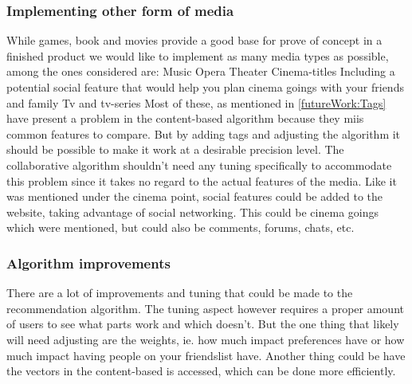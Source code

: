 \subsubsection{Implementing other form of media}
While games, book and movies provide a good base for prove of concept in a finished product we would like to implement as many media types as possible, among the ones considered are:
Music
Opera
Theater
Cinema-titles
Including a potential social feature that would help you plan cinema goings with your friends and family
Tv and tv-series
Most of these, as mentioned in \ref{futureWork:Tags} have present a problem in the content-based algorithm because they miis common features to compare. But by adding tags and adjusting the algorithm it should be possible to make it work at a desirable precision level. The collaborative algorithm shouldn’t need any tuning specifically to accommodate this problem since it takes no regard to the actual features of the media. Like it was mentioned under the cinema point, social features could be added to the website, taking advantage of social networking. This could be cinema goings which were mentioned, but could also be comments, forums, chats, etc.

\subsubsection{Algorithm improvements}
There are a lot of improvements and tuning that could be made to the recommendation algorithm. The tuning aspect however requires a proper amount of users to see what parts work and which doesn’t. But the one thing that likely will need adjusting are the weights, ie. how much impact preferences have or how much impact having people on your friendslist have. Another thing could be have the vectors in the content-based is accessed, which can be done more efficiently.

